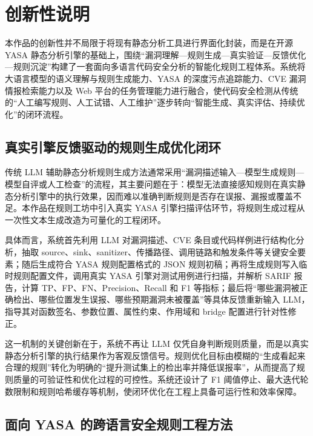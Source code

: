 \documentclass[a4paper,12pt,UTF8]{ctexart}
\numberwithin{figure}{section}
\numberwithin{table}{section}
\numberwithin{equation}{section}
\begin{document}
\newpage

\section{创新性说明}

{\songti
本作品的创新性并不局限于将现有静态分析工具进行界面化封装，而是在开源 YASA 静态分析引擎的基础上，围绕“漏洞理解—规则生成—真实验证—反馈优化—规则沉淀”构建了一套面向多语言代码安全分析的智能化规则工程体系。系统将大语言模型的语义理解与规则生成能力、YASA 的深度污点追踪能力、CVE 漏洞情报检索能力以及 Web 平台的任务管理能力进行融合，使代码安全检测从传统的“人工编写规则、人工试错、人工维护”逐步转向“智能生成、真实评估、持续优化”的闭环流程。
\par}

\subsection{真实引擎反馈驱动的规则生成优化闭环}

{\songti
传统 LLM 辅助静态分析规则生成方法通常采用“漏洞描述输入—模型生成规则—模型自评或人工检查”的流程，其主要问题在于：模型无法直接感知规则在真实静态分析引擎中的执行效果，因而难以准确判断规则是否存在误报、漏报或覆盖不足。本作品在规则工坊中引入真实 YASA 引擎扫描评估环节，将规则生成过程从一次性文本生成改造为可量化的工程闭环。

具体而言，系统首先利用 LLM 对漏洞描述、CVE 条目或代码样例进行结构化分析，抽取 source、sink、sanitizer、传播路径、调用链路和触发条件等关键安全要素；随后生成符合 YASA 规则配置格式的 JSON 规则初稿；再将生成规则写入临时规则配置文件，调用真实 YASA 引擎对测试用例进行扫描，并解析 SARIF 报告，计算 TP、FP、FN、Precision、Recall 和 F1 等指标；最后将“哪些漏洞被正确检出、哪些位置发生误报、哪些预期漏洞未被覆盖”等具体反馈重新输入 LLM，指导其对函数签名、参数位置、属性约束、作用域和 bridge 配置进行针对性修正。

这一机制的关键创新在于，系统不再让 LLM 仅凭自身判断规则质量，而是以真实静态分析引擎的执行结果作为客观反馈信号。规则优化目标由模糊的“生成看起来合理的规则”转化为明确的“提升测试集上的检出率并降低误报率”，从而提高了规则质量的可验证性和优化过程的可控性。系统还设计了 F1 阈值停止、最大迭代轮数限制和规则哈希缓存等机制，使闭环优化在工程上具备可运行性和效率保障。
\par}

\subsection{面向 YASA 的跨语言安全规则工程方法}
\end{document}
